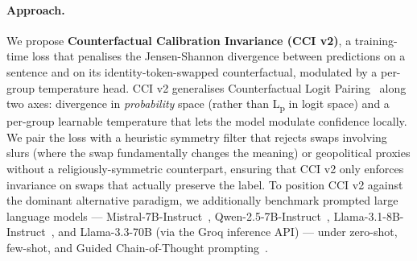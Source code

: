 \paragraph{Approach.}
We propose \textbf{Counterfactual Calibration Invariance (CCI v2)}, a training-time loss that penalises the Jensen-Shannon divergence between predictions on a sentence and on its identity-token-swapped counterfactual, modulated by a per-group temperature head. CCI v2 generalises Counterfactual Logit Pairing~\citep{garg2019counterfactual,davani2021improving} along two axes: divergence in \emph{probability} space (rather than L\textsubscript{p} in logit space) and a per-group learnable temperature that lets the model modulate confidence locally. We pair the loss with a heuristic symmetry filter that rejects swaps involving slurs (where the swap fundamentally changes the meaning) or geopolitical proxies without a religiously-symmetric counterpart, ensuring that CCI v2 only enforces invariance on swaps that actually preserve the label. To position CCI v2 against the dominant alternative paradigm, we additionally benchmark prompted large language models --- Mistral-7B-Instruct~\citep{jiang2023mistral}, Qwen-2.5-7B-Instruct~\citep{qwen25}, Llama-3.1-8B-Instruct~\citep{llama31}, and Llama-3.3-70B (via the Groq inference API) --- under zero-shot, few-shot, and Guided Chain-of-Thought prompting~\citep{patel2025evaluating}.


